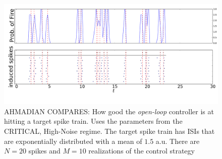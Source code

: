 \documentclass{article}
\begin{document}
\begin{figure}[htp]     
\begin{center}  
  \includegraphics[width=.99\textwidth]{Figs/TrainController/CRITLN_Ahmadian_ol_trains_sim_10.pdf}
  \caption[ ]{AHMADIAN COMPARES: How good the {\sl open-loop} controller is at
  hitting a target spike train. Uses the parameters from the CRITICAL, High-Noise regime. The
  target spike train has ISIs that are exponentially distributed with a
  mean of $1.5$ a.u. There are $N=20$ spikes and $M=10$ realizations of the
  control strategy}
  \label{fig:targettrain_ol_critlownoise}   
\end{center}
\end{figure}  
\end{document}
